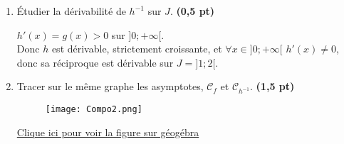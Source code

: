 \documentclass[12pt,a4paper]{article}
\begin{document}
\begin{enumerate}
          D'autre part :
          \[
              \lim_{x \to 0^+} h(x) = 1 \quad \text{et} \quad \lim_{x \to +\infty} h(x) = 2
          \]

          Donc :
          \[
              \boxed{h : \, ]0 ; +\infty[ \to ]1 ; 2[, \text{ bijection}}
          \]

    \item Étudier la dérivabilité de \( h^{-1} \) sur \( J \). \hfill \textbf{(0,5 pt)}

          \( h'(x) = g(x) > 0 \) sur \(]0 ; +\infty[\).\\
              Donc \( h \) est dérivable, strictement croissante, et \( \forall x \in ]0 ; +\infty[\) \( h'(x) \ne 0 \), donc sa réciproque est dérivable sur \( J = ]1 ; 2[ \).\\


    \item Tracer sur le même graphe les asymptotes, \( \mathcal{C}_f \) et \( \mathcal{C}_{h^{-1}} \). \hfill \textbf{(1,5 pt)}

          \begin{center}
              \begin{figure}[H]%
                  \centering
                  \texttt{[image: Compo2.png]}
              \end{figure}
          \end{center}
          \href{https://www.geogebra.org/classic/kgbuagda}{Clique ici pour voir la figure sur géogébra}
\end{enumerate}
\end{document}
